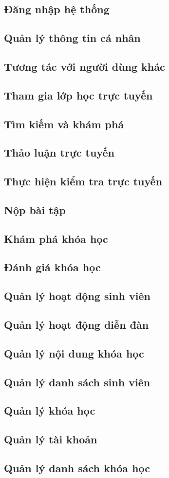 \documentclass[./../main_file.tex]{subfiles}
\begin{document}
\subsection{Đăng nhập hệ thống}
\subsection{Quản lý thông tin cá nhân}
\subsection{Tương tác với người dùng khác}
\subsection{Tham gia lớp học trực tuyến}
\subsection{Tìm kiếm và khám phá}
\subsection{Thảo luận trực tuyến}
\subsection{Thực hiện kiểm tra trực tuyến}
\subsection{Nộp bài tập}
\subsection{Khám phá khóa học}
\subsection{Đánh giá khóa học}
\subsection{Quản lý hoạt động sinh viên}
\subsection{Quản lý hoạt động diễn đàn}
\subsection{Quản lý nội dung khóa học}
\subsection{Quản lý danh sách sinh viên}
\subsection{Quản lý khóa học}
\subsection{Quản lý tài khoản}
\subsection{Quản lý danh sách khóa học}
\end{document}
